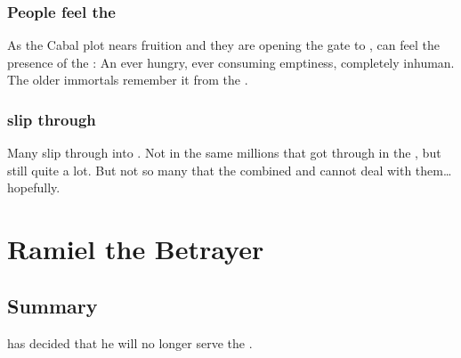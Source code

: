 \subsubsection{People feel the \Voidbringer}
As the Cabal plot nears fruition and they are opening the gate to \Erebos, \Miithians can feel the presence of the \Voidbringer: 
An ever hungry, ever consuming emptiness, completely inhuman. 
The older immortals remember it from the \secondbanewar. 





\subsubsection{\Banes{} slip through}
Many \lesserbanes{} slip through into \Miith. 
Not in the same millions that got through in the \secondbanewar, but still quite a lot. 
But not so many that the combined \dragons{} and \resphain{} cannot deal with them\ldots{} hopefully. 

















\section{Ramiel the Betrayer}









\subsection{Summary}
 has decided that he will no longer serve the \banelords. 


